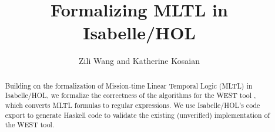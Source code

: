 \documentclass[11pt,a4paper]{article}
\begin{document}
\title{Formalizing MLTL in Isabelle/HOL}
\author{Zili Wang and Katherine Kosaian}
\maketitle

\begin{abstract}
  Building on the formalization of Mission-time Linear Temporal Logic (MLTL) in Isabelle/HOL, we formalize the correctness of the algorithms for the WEST tool \cite{DBLP:conf/ifm/ElwingGSTWR23,WEST2024tool}, which converts MLTL formulas to regular expressions.
 We use Isabelle/HOL's code export to generate Haskell code to validate the existing (unverified) implementation of the WEST tool.
\end{abstract}

\tableofcontents





\end{document}
